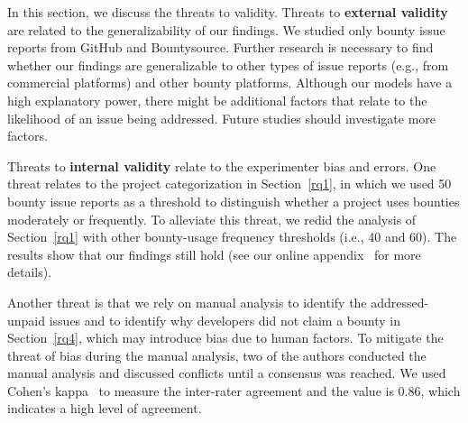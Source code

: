 In this section, we discuss the threats to validity.
Threats to \textbf{external validity} are related to the generalizability of our findings. We studied only bounty issue reports from GitHub and Bountysource. Further research is necessary to find whether our findings are generalizable to other types of issue reports (e.g., from commercial platforms) and other bounty platforms.
Although our models have a high explanatory power, there might be additional factors that relate to the likelihood of an issue being addressed. Future studies should investigate more factors.


Threats to \textbf{internal validity} relate to the experimenter bias and errors.
One threat relates to the project categorization in Section~\ref{rq1}, in which we used 50 bounty issue reports as a threshold to distinguish whether a project uses bounties moderately or frequently. To alleviate this threat, we redid the analysis of Section~\ref{rq1} with other bounty-usage frequency thresholds (i.e., 40 and 60). %
The results show that our findings still hold (see our online appendix~\cite{appendix} for more details).


Another threat is that we rely on manual analysis to identify the addressed-unpaid issues and to identify why developers did not claim a bounty in Section~\ref{rq4}, which may introduce bias due to human factors. To mitigate the threat of bias during the manual analysis, two of the authors conducted the manual analysis and discussed conflicts until a consensus was reached. We used Cohen's kappa~\cite{cohenkappa} to measure the inter-rater agreement and the value is 0.86, which indicates a high level of agreement.
